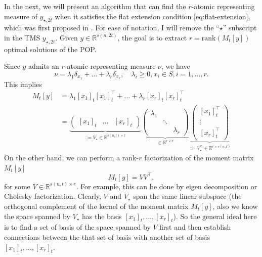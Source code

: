 \documentclass[
]{book}
\theoremstyle{definition}
\theoremstyle{definition}
\theoremstyle{definition}
\theoremstyle{definition}
\theoremstyle{remark}
\begin{document}
In the next, we will present an algorithm that can find the \(r\)-atomic representing measure of \(y_{\star,2t}\) when it satisfies the flat extension condition \eqref{eq:flat-extension}, which was first proposed in \citep{henrion05ppc-detecting}. For ease of notation, I will remove the ``\(\star\)'' subscript in the TMS \(y_{\star,2t}\). Given \(y \in \mathbb{R}^{s(n,2t)}\), the goal is to extract \(r = \mathrm{rank}(M_t[y])\) optimal solutions of the POP.

Since \(y\) admits an \(r\)-atomic representing measure \(\nu\), we have
\[
\nu = \lambda_1 \delta_{x_1} + \dots + \lambda_r \delta_{x_r}, \quad \lambda_i \geq 0, x_i \in S, i=1,\dots,r.
\]
This implies
\begin{equation}
\begin{split}
M_t[y] & = \lambda_1 [x_1]_t [x_1]_t^\top+ \dots + \lambda_r [x_r]_t [x_r]_t^\top\\
& = \underbrace{\begin{pmatrix} [x_1]_t & \dots & [x_r]_t \end{pmatrix}}_{:= V_\star \in \mathbb{R}^{s(n,t) \times r}}
\underbrace{\begin{pmatrix} \lambda_1 &  &  \\
 & \ddots & \\
 &  & \lambda_r \end{pmatrix}}_{\in \mathbb{R}^{r \times r}}
\underbrace{\begin{pmatrix}
[x_1]_t^\top\\
\vdots \\
[x_r]_t^\top
 \end{pmatrix}}_{:= V_\star^\top\in \mathbb{R}^{r \times s(n,t)}}
\end{split}
\end{equation}
On the other hand, we can perform a rank-\(r\) factorization of the moment matrix \(M_t[y]\)
\[
M_t[y] = V V^\top,
\]
for some \(V \in \mathbb{R}^{s(n,t) \times r}\). For example, this can be done by eigen decomposition or Cholesky factorization. Clearly, \(V\) and \(V_\star\) span the same linear subspace (the orthogonal complement of the kernel of the moment matrix \(M_t[y]\), also we know the space spanned by \(V_\star\) has the basis \([x_1]_t,\dots,[x_r]_t\)). So the general ideal here is to find a set of basis of the space spanned by \(V\) first and then establish connections between the that set of basis with another set of basis \([x_1]_t,\dots,[x_r]_t\).
\end{document}
